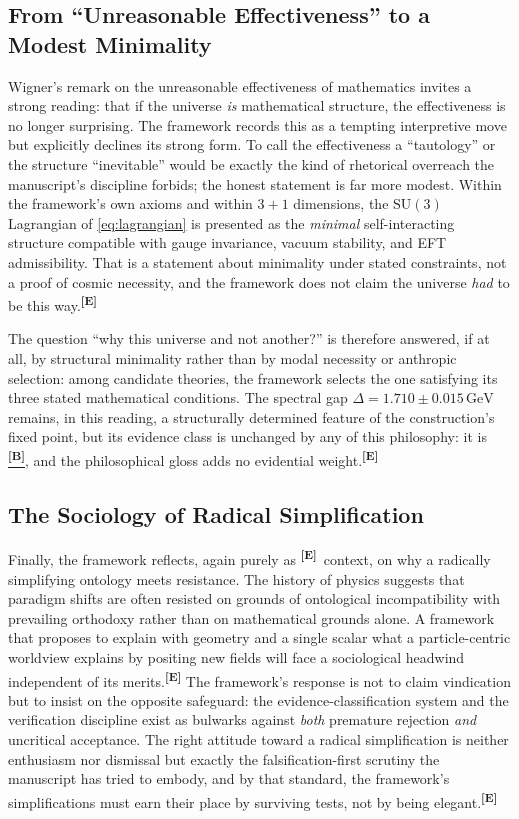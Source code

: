 \documentclass[12pt,a4paper,twoside]{article}
\theoremstyle{plain}
\theoremstyle{definition}
\theoremstyle{remark}
\newcommand{\GeV}{\,\mathrm{GeV}}
\newcommand{\catmark}[1]{\textsuperscript{\textsf{\textbf{[#1]}}}}
\newcommand{\Bdelta}{\hyperref[box:pi-override-delta]{\catmark{B}}}
\newcommand{\DeltaGap}{1.710 \pm 0.015\GeV} %
\begin{document}
\subsection{From ``Unreasonable Effectiveness'' to a Modest Minimality}
\label{subsec:inevitability}

Wigner's remark on the unreasonable effectiveness of mathematics invites a strong reading: that if the universe \emph{is} mathematical structure, the effectiveness is no longer surprising. The framework records this as a tempting interpretive move but explicitly declines its strong form. To call the effectiveness a ``tautology'' or the structure ``inevitable'' would be exactly the kind of rhetorical overreach the manuscript's discipline forbids; the honest statement is far more modest. Within the framework's own axioms and within $3+1$ dimensions, the $\mathrm{SU}(3)$ Lagrangian of \cref{eq:lagrangian} is presented as the \emph{minimal} self-interacting structure compatible with gauge invariance, vacuum stability, and EFT admissibility. That is a statement about minimality under stated constraints, not a proof of cosmic necessity, and the framework does not claim the universe \emph{had} to be this way.\catmark{E}

The question ``why this universe and not another?'' is therefore answered, if at all, by structural minimality rather than by modal necessity or anthropic selection: among candidate theories, the framework selects the one satisfying its three stated mathematical conditions. The spectral gap $\Delta = \DeltaGap$ remains, in this reading, a structurally determined feature of the construction's fixed point, but its evidence class is unchanged by any of this philosophy: it is \Bdelta, and the philosophical gloss adds no evidential weight.\catmark{E}

\subsection{The Sociology of Radical Simplification}
\label{subsec:sociology}

Finally, the framework reflects, again purely as \catmark{E}\ context, on why a radically simplifying ontology meets resistance. The history of physics suggests that paradigm shifts are often resisted on grounds of ontological incompatibility with prevailing orthodoxy rather than on mathematical grounds alone. A framework that proposes to explain with geometry and a single scalar what a particle-centric worldview explains by positing new fields will face a sociological headwind independent of its merits.\catmark{E} The framework's response is not to claim vindication but to insist on the opposite safeguard: the evidence-classification system and the verification discipline exist as bulwarks against \emph{both} premature rejection \emph{and} uncritical acceptance. The right attitude toward a radical simplification is neither enthusiasm nor dismissal but exactly the falsification-first scrutiny the manuscript has tried to embody, and by that standard, the framework's simplifications must earn their place by surviving tests, not by being elegant.\catmark{E}
\end{document}
